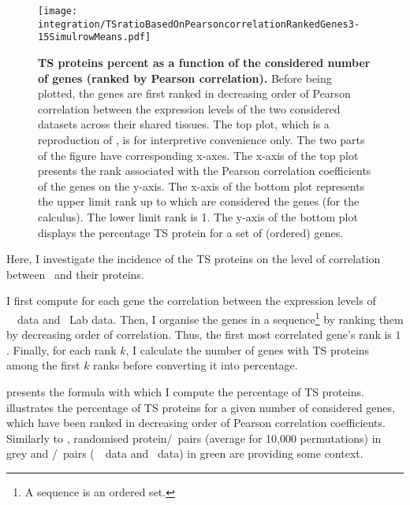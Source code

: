 \begin{figure}[!ht]
    \texttt{[image: integration/TSratioBasedOnPearsoncorrelationRankedGenes3-15SimulrowMeans.pdf]}\centering
    \vspace{-3mm}
    \caption[TS proteins percentage as a function of
    the considered number of genes (ranked by Pearson correlation)]{\label{fig:Spe_Cor}%
    \textbf{TS proteins percent as a function of the considered
    number of genes (ranked by Pearson correlation).}
    Before being plotted,
    the genes are first ranked in decreasing order of Pearson correlation
    between the expression levels of the two considered datasets
    across their shared tissues.
    The top plot, which is a reproduction of ,
    is for interpretive convenience only.
    The two parts of the figure have corresponding x-axes.
    The x-axis of the top plot presents the rank associated with
    the Pearson correlation coefficients of the genes on the y-axis.
    The x-axis of the bottom plot represents
    the upper limit rank up to which are considered
    the genes (for the calculus).
    The lower limit rank is 1.
    The y-axis of the bottom plot displays the percentage \gls{TS} protein
    for a set of (ordered) genes.
    }
\end{figure}

Here,
I investigate the incidence of the \gls{TS} proteins
on the level of correlation between \mRNAs\ and their proteins.

I first compute for each gene the correlation between the expression levels
of \uhlen\ \etal\ data and \pandey\ Lab data.
Then, I organise the genes in a sequence\footnote{A sequence is an ordered set.}
by ranking them by decreasing order of correlation.
Thus, the first most correlated gene's rank is $1$.
Finally, for each rank $k$, I calculate the number of genes with \gls{TS} proteins
among the first $k$ ranks before converting it into percentage.\mybr\

 presents the formula with which I compute
the percentage of \gls{TS} proteins.
 illustrates the percentage of \gls{TS} proteins
for a given number of considered genes,
which have been ranked in decreasing order of Pearson correlation coefficients.
Similarly to ,
randomised protein/\mRNA\ pairs (average for 10,000 permutations) in grey
and \mRNA/\mRNA\ pairs (\uhlen\ \etal\ data and \gtex\ data) in green
are providing some context.\mybr\

